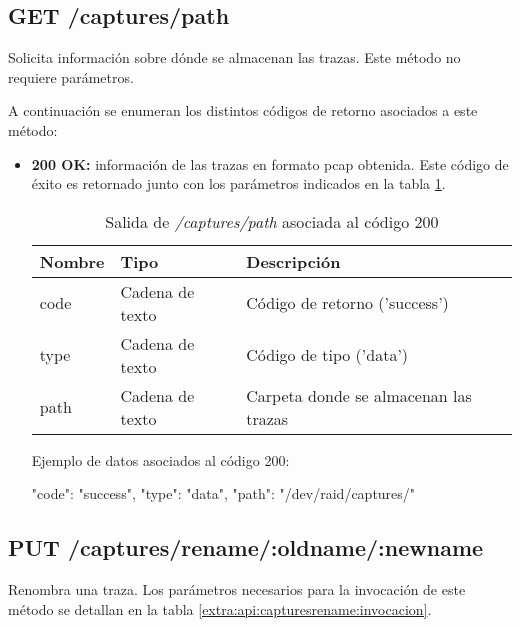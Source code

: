 %
%
\subsection{GET /captures/path}
Solicita información sobre dónde se almacenan las \glspl{traza}. Este método no requiere parámetros.

A continuación se enumeran los distintos códigos de retorno asociados a este método:
\begin{itemize}

\item{\textbf{200 OK:} información de las \glspl{traza} en formato \gls{pcap} obtenida. Este código de éxito es retornado junto con los parámetros indicados en la tabla \ref{extra:api:capturespath:ok}.
\begin{table}[H]
\centering
\begin{tabular}{|l|l|l|}
\hline
\rowcolor[HTML]{F5F5F5}
\textbf{Nombre}                & \textbf{Tipo}   & \textbf{Descripción}                            \\ \hline
code                           & Cadena de texto & Código de retorno ('success')                   \\ \hline
type                           & Cadena de texto & Código de tipo ('data')                         \\ \hline
path                           & Cadena de texto & Carpeta donde se almacenan las \glspl{traza}    \\ \hline
\end{tabular}
\caption{Salida de \textit{/captures/path} asociada al código 200}
\label{extra:api:capturespath:ok}
\end{table}
\begin{minipage}{\textwidth}
Ejemplo de datos asociados al código 200:

\begin{code}[language=json]
{
  "code": "success",
  "type": "data",
  "path": "/dev/raid/captures/"
}
\end{code}
\end{minipage}
}

\end{itemize}

%
%
\subsection{PUT /captures/rename/:oldname/:newname}
Renombra una \gls{traza}. Los parámetros necesarios para la invocación de este método se detallan en la tabla \ref{extra:api:capturesrename:invocacion}.

